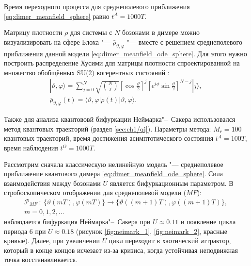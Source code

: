 Время переходного процесса для среднеполевого приближения \cref{eq:dimer_meanfield_sphere} равно \(t^A = 1000T\).

Матрицу плотности \(\rho\) для системы с \(N\) бозонами в димере можно визуализировать на сфере Блоха \cite{Nielsen2010} "--- \(\bar{\rho}_{\vartheta, \varphi}\) "--- вместе с решением среднеполевого приближения данной модели \cref{eq:dimer_meanfield_ode_sphere}. Для этого нужно построить распределение Хусими \cite{Stockmann2006} для матрицы плотности спроектированной на множество обобщённых SU(2) когерентных состояний \cite{Arecchi1972}:
\begin{equation}
	\label{eq:dimer_husimi}
	\begin{gathered}
		|\vartheta , \varphi \rangle = \sum_{j=0}^{N}\sqrt{\binom{N}{j}}\left[\cos{\frac{\vartheta}{2}}\right]^j \left[e^{i\phi}\sin{\frac{\vartheta}{2}}\right]^{N-j} |j\rangle, \\
		\bar{\rho}_{\vartheta, \varphi}(t) = \langle \vartheta , \varphi| \rho(t) |\vartheta , \varphi \rangle.
	\end{gathered}
\end{equation}

Также для анализа квантововй бифуркации Неймарка"--~Сакера использовался метод квантовых траекторий (раздел \cref{sec:ch1/qj}). Параметры метода: \(M_r=100\) квантовых траекторий, время достижения асимптотического состояния \(t^A = 100T\), время наблюдения \(t^O = 1000T\).

Рассмотрим сначала классическую нелинейную модель "--- среднеполевое приближение квантового димера \cref{eq:dimer_meanfield_ode_sphere}.
Сила взаимодействия между бозонами \(U\) является бифуркационным параметром.
В стробоскопическом отображении для среднеполевой модели (\(MF\)):
\begin{equation}
	\label{eq:dimer_stroboscopic_mf}
	\begin{gathered}
		\mathcal{P}_{MF}~:~\{\vartheta(mT),\varphi(mT)\} \to \{\vartheta((m+1)T),\varphi((m+1)T)\}, \\
		m=0, 1, 2, \ldots
	\end{gathered}
\end{equation}
наблюдается бифуркация Неймарка"--~Сакера при \(U\approx0.11\) и появление цикла периода 6 при \(U\approx0.18\) (рисунок \cref{fig:neimark_1}, \cref{fig:neimark_2}, красные кривые).
Далее, при увеличении \(U\) цикл переходит в хаотический аттрактор, который в конце концов исчезает из-за кризиса, когда устойчивая неподвижная точка восстанавливается.

